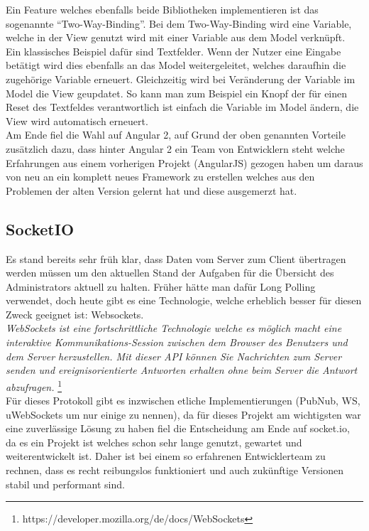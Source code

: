Ein Feature welches ebenfalls beide Bibliotheken implementieren ist das sogenannte ``Two-Way-Binding''. Bei dem Two-Way-Binding wird eine Variable, welche in der View genutzt wird mit einer Variable aus dem Model verknüpft. Ein klassisches Beispiel dafür sind Textfelder. Wenn der Nutzer eine Eingabe betätigt wird dies ebenfalls an das Model weitergeleitet, welches daraufhin die zugehörige Variable erneuert. Gleichzeitig wird bei Veränderung der Variable im Model die View geupdatet. So kann man zum Beispiel ein Knopf der für einen Reset des Textfeldes verantwortlich ist einfach die Variable im Model ändern, die View wird automatisch erneuert. \\

Am Ende fiel die Wahl auf Angular 2, auf Grund der oben genannten Vorteile zusätzlich dazu, dass hinter Angular 2 ein Team von Entwicklern steht welche Erfahrungen aus einem vorherigen Projekt (AngularJS) gezogen haben um daraus von neu an ein komplett neues Framework zu erstellen welches aus den Problemen der alten Version gelernt hat und diese ausgemerzt hat.

\subsection{SocketIO}

Es stand bereits sehr früh klar, dass Daten vom Server zum Client übertragen werden müssen um den aktuellen Stand der Aufgaben für die Übersicht des Administrators aktuell zu halten. Früher hätte man dafür Long Polling verwendet, doch heute gibt es eine Technologie, welche erheblich besser für diesen Zweck geeignet ist: Websockets. \\

\emph{\glqq   
WebSockets ist eine fortschrittliche Technologie welche es möglich macht eine interaktive Kommunikations-Session zwischen dem Browser des Benutzers und dem Server herzustellen. Mit dieser API können Sie Nachrichten zum Server senden und ereignisorientierte Antworten erhalten ohne beim Server die Antwort abzufragen.
\grqq} \footnote{https://developer.mozilla.org/de/docs/WebSockets} \\


Für dieses Protokoll gibt es inzwischen etliche Implementierungen (PubNub, WS, uWebSockets um nur einige zu nennen), da für dieses Projekt am wichtigsten war eine zuverlässige Lösung zu haben fiel die Entscheidung am Ende auf socket.io, da es ein Projekt ist welches schon sehr lange genutzt, gewartet und weiterentwickelt ist. Daher ist bei einem so erfahrenen Entwicklerteam zu rechnen, dass es recht reibungslos funktioniert und auch zukünftige Versionen stabil und performant sind.

